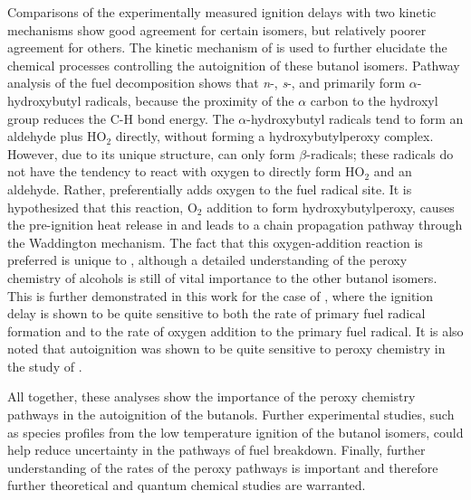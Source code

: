 \documentclass[12pt, letterpaper]{article}
\begin{document}
Comparisons of the experimentally measured ignition delays with two kinetic
mechanisms show good agreement for certain isomers, but relatively poorer
agreement for others. The kinetic mechanism of \textcite{Sarathy2012} is used
to further elucidate the chemical processes controlling the autoignition of
these butanol isomers. Pathway analysis of the fuel decomposition shows that
\textit{n}-, \textit{s}-, and \iBuOH{} primarily form
$\alpha$-hydroxybutyl radicals, because the proximity of the $\alpha$ carbon to
the hydroxyl group reduces the C-H bond energy. The $\alpha$-hydroxybutyl radicals
tend to form an aldehyde plus HO$_2$  directly, without forming a
hydroxybutylperoxy complex. However, due to its unique structure,
\tBuOH{} can only form $\beta$-radicals; these radicals do not have
the tendency to react with oxygen to directly form HO$_2$  and an aldehyde.
Rather, \tBuOH{} preferentially adds oxygen to the fuel radical site.
It is hypothesized that this reaction, O$_2$  addition to form
hydroxybutylperoxy, causes the pre-ignition heat release in \tBuOH{}
and leads to a chain propagation pathway through the Waddington mechanism. The
fact that this oxygen-addition reaction is preferred is unique to
\tBuOH{}, although a detailed understanding of the peroxy chemistry
of alcohols is still of vital importance to the other butanol isomers. This is
further demonstrated in this work for the case of \iBuOH{}, where the
ignition delay is shown to be quite sensitive to both the rate of primary fuel
radical formation and to the rate of oxygen addition to the primary fuel
radical. It is also noted that \nBuOH{} autoignition was shown to be
quite sensitive to peroxy chemistry in the study of \textcite{Vranckx2011}.

All together, these analyses show the importance of the peroxy chemistry
pathways in the autoignition of the butanols. Further experimental studies,
such as species profiles from the low temperature ignition of the butanol
isomers, could help reduce uncertainty in the pathways of fuel breakdown.
Finally, further understanding of the rates of the peroxy pathways is
important and therefore further theoretical and quantum chemical studies are
warranted.
\end{document}

